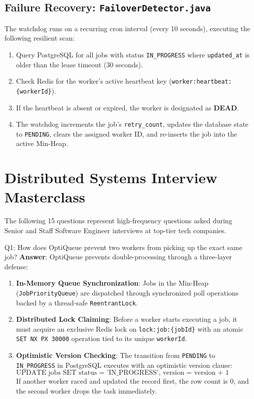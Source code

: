 \documentclass[11pt,a4paper]{article}
\begin{document}
\subsection{Failure Recovery: \texttt{FailoverDetector.java}}
The watchdog runs on a recurring cron interval (every 10 seconds), executing the following resilient scan:
\begin{enumerate}
    \item Query PostgreSQL for all jobs with status \texttt{IN\_PROGRESS} where \texttt{updated\_at} is older than the lease timeout (30 seconds).
    \item Check Redis for the worker's active heartbeat key (\texttt{worker:heartbeat:\{workerId\}}).
    \item If the heartbeat is absent or expired, the worker is designated as \textbf{DEAD}.
    \item The watchdog increments the job's \texttt{retry\_count}, updates the database state to \texttt{PENDING}, clears the assigned worker ID, and re-inserts the job into the active Min-Heap.
\end{enumerate}

\newpage
\section{Distributed Systems Interview Masterclass}
The following 15 questions represent high-frequency questions asked during Senior and Staff Software Engineer interviews at top-tier tech companies.

\begin{interviewbox}{Q1: How does OptiQueue prevent two workers from picking up the exact same job?}
\textbf{Answer}:
OptiQueue prevents double-processing through a three-layer defense:
\begin{enumerate}
    \item \textbf{In-Memory Queue Synchronization}: Jobs in the Min-Heap (\texttt{JobPriorityQueue}) are dispatched through synchronized poll operations backed by a thread-safe \texttt{ReentrantLock}.
    \item \textbf{Distributed Lock Claiming}: Before a worker starts executing a job, it must acquire an exclusive Redis lock on \texttt{lock:job:\{jobId\}} with an atomic \texttt{SET NX PX 30000} operation tied to its unique \texttt{workerId}.
    \item \textbf{Optimistic Version Checking}: The transition from \texttt{PENDING} to \texttt{IN\_PROGRESS} in PostgreSQL executes with an optimistic version clause:
    \[ \text{UPDATE jobs SET status = 'IN\_PROGRESS', version = version + 1 WHERE id = :id AND status = 'PENDING'} \]
    If another worker raced and updated the record first, the row count is 0, and the second worker drops the task immediately.
\end{enumerate}
\end{interviewbox}
\end{document}
